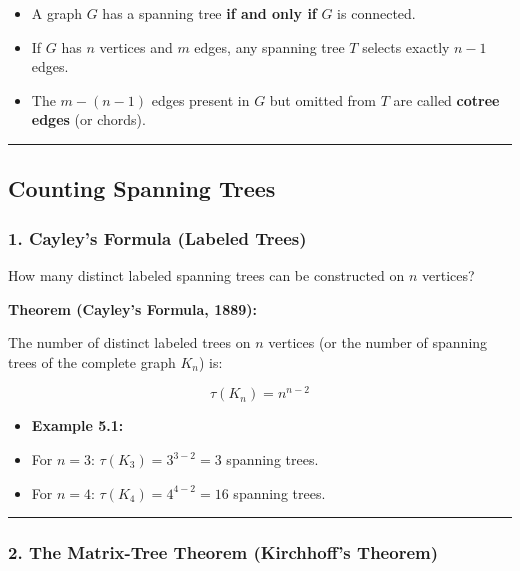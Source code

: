 \documentclass[
]{book}
\providecommand{\tightlist}{%
  \setlength{\itemsep}{0pt}\setlength{\parskip}{0pt}}
\theoremstyle{definition}
\theoremstyle{definition}
\theoremstyle{definition}
\theoremstyle{definition}
\theoremstyle{remark}
\begin{document}
\begin{itemize}
\tightlist
\item
  A graph \(G\) has a spanning tree \textbf{if and only if} \(G\) is connected.
\item
  If \(G\) has \(n\) vertices and \(m\) edges, any spanning tree \(T\) selects exactly \(n - 1\) edges.
\item
  The \(m - (n - 1)\) edges present in \(G\) but omitted from \(T\) are called \textbf{cotree edges} (or chords).
\end{itemize}

\begin{center}\rule{0.5\linewidth}{0.5pt}\end{center}

\subsection{Counting Spanning Trees}\label{counting-spanning-trees}

\subsubsection{1. Cayley's Formula (Labeled Trees)}\label{cayleys-formula-labeled-trees}

How many distinct labeled spanning trees can be constructed on \(n\) vertices?

\textbf{Theorem (Cayley's Formula, 1889):}

The number of distinct labeled trees on \(n\) vertices (or the number of spanning trees of the complete graph \(K_n\)) is:

\[\tau(K_n) = n^{n-2}\]

\begin{itemize}
\tightlist
\item
  \textbf{Example 5.1:}
\item
  For \(n = 3\): \(\tau(K_3) = 3^{3-2} = 3\) spanning trees.
\item
  For \(n = 4\): \(\tau(K_4) = 4^{4-2} = 16\) spanning trees.
\end{itemize}

\begin{center}\rule{0.5\linewidth}{0.5pt}\end{center}

\subsubsection{2. The Matrix-Tree Theorem (Kirchhoff's Theorem)}\label{the-matrix-tree-theorem-kirchhoffs-theorem}
\end{document}
